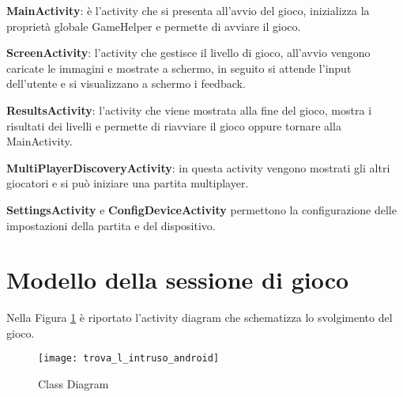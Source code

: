 \begin{description}
\item \textbf{MainActivity}: \`{e} l'activity che si presenta all'avvio del gioco, inizializza la propriet\`{a} globale GameHelper e permette di avviare il gioco.
\item \textbf{ScreenActivity}: l'activity che gestisce il livello di gioco, all'avvio vengono caricate le immagini e mostrate a schermo, in seguito si attende l'input dell'utente e si visualizzano a schermo i feedback.
\item \textbf{ResultsActivity}: l'activity che viene mostrata alla fine del gioco, mostra i risultati dei livelli e permette di riavviare il gioco oppure tornare alla MainActivity.
\item \textbf{MultiPlayerDiscoveryActivity}: in questa activity vengono mostrati gli altri giocatori e si pu\`{o} iniziare una partita multiplayer.
\item \textbf{SettingsActivity} e \textbf{ConfigDeviceActivity} permettono la configurazione delle impostazioni della partita e del dispositivo.
\end{description}

\section{Modello della sessione di gioco}

\noindent
Nella Figura \ref{fig:activity_diagram} \`{e} riportato l'activity diagram che schematizza lo svolgimento del gioco.

\begin{figure}
	\centering
    \texttt{[image: trova\_l\_intruso\_android]}
	\caption{Class Diagram}
	\label{fig:activity_diagram}
\end{figure}



